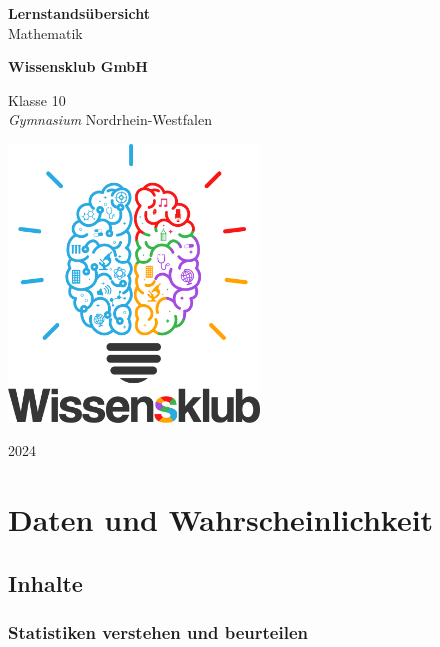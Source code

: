\documentclass{article}
\begin{document}
\begin{titlepage}
    \begin{center}
        \vspace*{1cm}
            
        \Huge
        \textbf{Lernstandsübersicht}\\            
        \vspace{0.5cm}
        \LARGE
        Mathematik
            
        \vspace{1.5cm}
            
        \textbf{Wissensklub GmbH}
            
        \vfill
            
        Klasse 10\\
        \textit{Gymnasium} Nordrhein-Westfalen
            
        \vspace{0.8cm}
            
        \includegraphics[width=0.5\textwidth]{Wissensklub-Logo.png}
            
        \Large
        2024          
    \end{center}
\end{titlepage}

\section{Daten und Wahrscheinlichkeit}
\subsection{Inhalte}
\subsubsection*{Statistiken verstehen und beurteilen}
\end{document}
